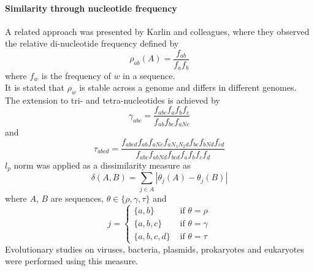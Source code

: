 \documentclass[twocolumn]{bmcart}%
\begin{document}
\paragraph*{Similarity through nucleotide frequency}
A related approach was presented by Karlin and colleagues, where they observed the relative di-nucleotide frequency defined by $$\rho_{ab}(A)=\frac{f_{ab}}{f_af_b}$$
where $f_w$ is the frequency of $w$ in a sequence.\\
It is stated that $\rho_w$ is stable across a genome and differs in different genomes. The extension to tri- and tetra-nucleotides is achieved by $$\gamma_{abc}=\frac{f_{abc}f_af_bf_c}{f_{ab}f_{bc}f_{aNc}}$$
and 
$$\tau_{abcd}=\frac{f_{abcd}f_{ab}f_{aNc}f_{aN_1N_2d}f_{bc}f_{bNd}f_{cd}}{f_{abc}f_{abNd}f_{bcd}f_af_bf_cf_d}$$
$l_p$ norm was applied as a dissimilarity measure as
$$\delta(A,B)=\sum_{j\in A}|\theta_j(A)-\theta_j(B)|$$
where $A$, $B$ are sequences, $\theta \in \{\rho, \gamma, \tau\}$ and
$$j=\begin{cases}
\{a,b\} &\textrm{ if }\theta=\rho\\
\{a,b,c\} & \textrm{ if }\theta=\gamma\\
\{a,b,c,d\} &\textrm{ if }\theta=\tau
\end{cases}$$
Evolutionary studies on viruses, bacteria, plasmids, prokaryotes and eukaryotes were performed using this measure\cite{doi:10.1093/bib/bbt067}.
\end{document}
